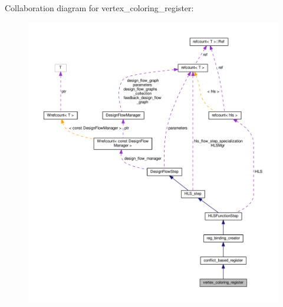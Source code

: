 Collaboration diagram for vertex\+\_\+coloring\+\_\+register\+:
\nopagebreak
\begin{figure}[H]
\begin{center}
\leavevmode
\includegraphics[width=350pt]{d3/d47/classvertex__coloring__register__coll__graph}
\end{center}
\end{figure}
